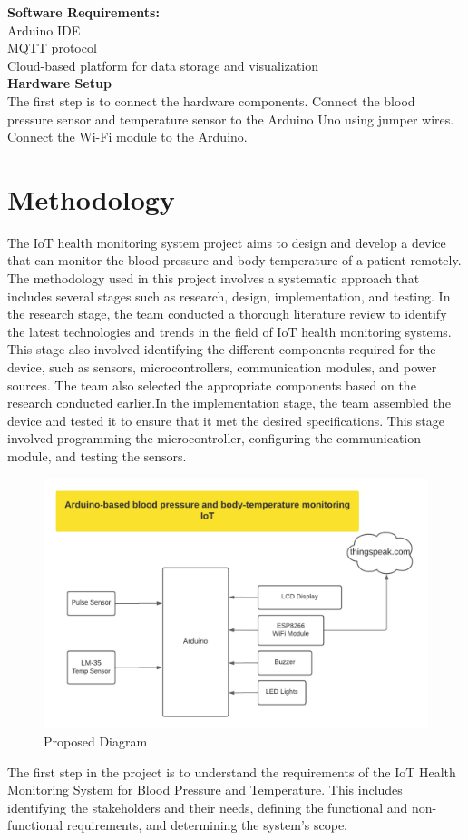 \documentclass[conference]{IEEEtran}
\begin{document}
\textbf{Software Requirements:}\\
\textbullet Arduino IDE\\
\textbullet MQTT protocol\\
\textbullet Cloud-based platform for data storage and visualization\\
\textbf{Hardware Setup}\\
The first step is to connect the hardware components. Connect the blood pressure sensor and temperature sensor to the Arduino Uno using jumper wires. Connect the Wi-Fi module to the Arduino.

    \section{Methodology}
The IoT health monitoring system project aims to design and develop a device that can monitor the blood pressure and body temperature of a patient remotely. The methodology used in this project involves a systematic approach that includes several stages such as research, design, implementation, and testing. In the research stage, the team conducted a thorough literature review to identify the latest technologies and trends in the field of IoT health monitoring systems. This stage also involved identifying the different components required for the device, such as sensors, microcontrollers, communication modules, and power sources. The team also selected the appropriate components based on the research conducted earlier.In the implementation stage, the team assembled the device and tested it to ensure that it met the desired specifications. This stage involved programming the microcontroller, configuring the communication module, and testing the sensors.\\
\begin{figure}[h]
    \centering
    \includegraphics[width=.5\textwidth]{fullfig.png}
    \caption{Proposed Diagram}
    \label{fig:mesh1}
\end{figure}
The first step in the project is to understand the requirements of the IoT Health Monitoring System for Blood Pressure and Temperature. This includes identifying the stakeholders and their needs, defining the functional and non-functional requirements, and determining the system's scope.
\end{document}
